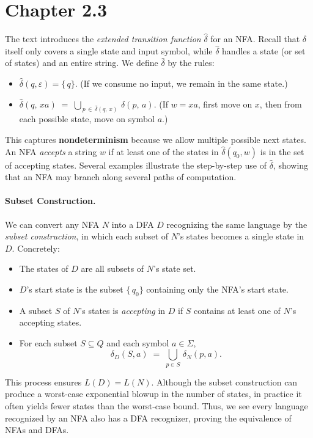 \documentclass{article}
\theoremstyle{theorem}
\theoremstyle{definition}
\theoremstyle{remark}
\begin{document}
\section{Chapter 2.3}

The text introduces the \emph{extended transition function} \(\hat{\delta}\) for an NFA. 
Recall that \(\delta\) itself only covers a single state and input symbol, while 
\(\hat{\delta}\) handles a state (or set of states) and an entire string. We define 
\(\hat{\delta}\) by the rules:

\begin{itemize}
\item
  \(\hat{\delta}(q,\varepsilon) = \{\,q\}\). 
  (If we consume no input, we remain in the same state.)
\item
  \(\hat{\delta}(q,\,xa) \;=\;\bigcup_{\,p \,\in\, \hat{\delta}(q,\,x)\!}\,\delta(p,\,a)\). 
  (If \(w=xa\), first move on \(x\), then from each possible state, move on symbol \(a\).)
\end{itemize}

This captures \textbf{nondeterminism} because we allow multiple possible next states. An NFA 
\emph{accepts} a string \(w\) if at least one of the states in \(\hat{\delta}(q_{0}, w)\) is 
in the set of accepting states. Several examples illustrate the step-by-step use of 
\(\hat{\delta}\), showing that an NFA may branch along several paths of computation.

\paragraph{Subset Construction.}
We can convert any NFA \(N\) into a DFA \(D\) recognizing the same language by 
the \emph{subset construction}, in which each subset of \(N\)'s states becomes a single 
state in \(D\). Concretely:
\begin{itemize}
\item
  The states of \(D\) are all subsets of \(N\)'s state set.
\item
  \(D\)'s start state is the subset \(\{\,q_{0}\}\) containing only the NFA's start state.
\item
  A subset \(S\) of \(N\)'s states is \emph{accepting} in \(D\) if \(S\) contains at least 
  one of \(N\)'s accepting states.
\item
  For each subset \(S\subseteq Q\) and each symbol \(a\in\Sigma\),
  \[
    \delta_{D}(S,a)
    \;=\;
    \bigcup_{p\in S}\,\delta_{N}(p,a).
  \]
\end{itemize}
This process ensures \(L(D)=L(N)\). Although the subset construction can produce a worst-case 
exponential blowup in the number of states, in practice it often yields fewer states than 
the worst‐case bound. Thus, we see every language recognized by an NFA also has a DFA 
recognizer, proving the equivalence of NFAs and DFAs. 
\end{document}
